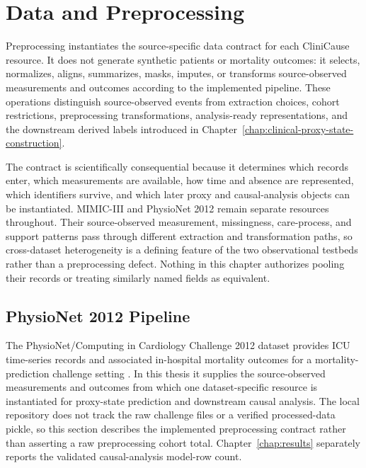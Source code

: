 \chapter{Data and Preprocessing}
\label{chap:data-preprocessing}

Preprocessing instantiates the source-specific data contract for each CliniCause resource.  It does not generate synthetic patients or mortality outcomes: it selects, normalizes, aligns, summarizes, masks, imputes, or transforms source-observed measurements and outcomes according to the implemented pipeline.  These operations distinguish source-observed events from extraction choices, cohort restrictions, preprocessing transformations, analysis-ready representations, and the downstream derived labels introduced in Chapter~\ref{chap:clinical-proxy-state-construction}.

The contract is scientifically consequential because it determines which records enter, which measurements are available, how time and absence are represented, which identifiers survive, and which later proxy and causal-analysis objects can be instantiated.  MIMIC-III and PhysioNet 2012 remain separate resources throughout.  Their source-observed measurement, missingness, care-process, and support patterns pass through different extraction and transformation paths, so cross-dataset heterogeneity is a defining feature of the two observational testbeds rather than a preprocessing defect.  Nothing in this chapter authorizes pooling their records or treating similarly named fields as equivalent.

\section{PhysioNet 2012 Pipeline}
\label{sec:data-preprocessing:physionet-2012-pipeline}

The PhysioNet/Computing in Cardiology Challenge 2012 dataset provides ICU time-series records and associated in-hospital mortality outcomes for a mortality-prediction challenge setting \cite{silva2012physionet}.  In this thesis it supplies the source-observed measurements and outcomes from which one dataset-specific resource is instantiated for proxy-state prediction and downstream causal analysis.  The local repository does not track the raw challenge files or a verified processed-data pickle, so this section describes the implemented preprocessing contract rather than asserting a raw preprocessing cohort total.  Chapter~\ref{chap:results} separately reports the validated causal-analysis model-row count.

